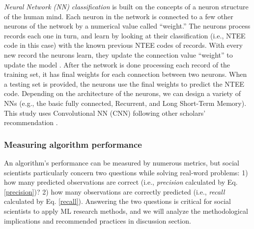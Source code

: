 \documentclass[11pt]{article}
\begin{document}
\textit{Neural Network (NN) classification} is built on the concepts of a neuron structure of the human mind. Each neuron in the network is connected to a few other neurons of the network by a numerical value called ``weight.'' The neurons process records each one in turn, and learn by looking at their classification (i.e., NTEE code in this case) with the known previous NTEE codes of records. With every new record the neurons learn, they update the connection value ``weight'' to update the model \parencites[163]{CollobertUnifiedArchitectureNatural2008}. After the network is done processing each record of the training set, it has final weights for each connection between two neurons. When a testing set is provided, the neurons use the final weights to predict the NTEE code. Depending on the architecture of the neurons, we can design a variety of NNs (e.g., the basic fully connected, Recurrent, and Long Short-Term Memory). This study uses Convolutional NN (CNN) following other scholars' recommendation \parencite{ZhangSensitivityAnalysisPractitioners2015}.


\subsubsection{Measuring algorithm performance}

An algorithm's performance can be measured by numerous metrics, but social scientists particularly concern two questions while solving real-word problems: 1) how many predicted observations are correct (i.e., \textit{precision} calculated by Eq. \ref{precision})? 2) how many observations are correctly predicted (i.e., \textit{recall} calculated by Eq. \ref{recall}). Answering the two questions is critical for social scientists to apply ML research methods, and we will analyze the methodological implications and recommended practices in discussion section.
\end{document}

